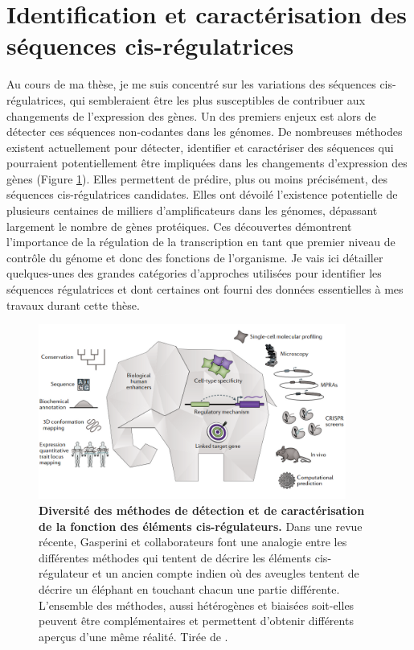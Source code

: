 \section{Identification et caractérisation des séquences \gls{cis}-régulatrices}
\label{sec:identif-cis}

Au cours de ma thèse, je me suis concentré sur les variations des séquences \gls{cis}-régulatrices, qui sembleraient être les plus susceptibles de contribuer aux changements de l’expression des gènes. Un des premiers enjeux est alors de détecter ces séquences non-codantes dans les génomes. De nombreuses méthodes existent actuellement pour détecter, identifier et caractériser des séquences qui pourraient potentiellement être impliquées dans les changements d’expression des gènes (Figure \ref{fig:Fig7}). Elles permettent de prédire, plus ou moins précisément, des séquences \gls{cis}-régulatrices candidates. Elles ont dévoilé l’existence potentielle de plusieurs centaines de milliers d’\glspl{amplificateur} dans les génomes, dépassant largement le nombre de gènes protéiques. Ces découvertes démontrent l’importance de la régulation de la transcription en tant que premier niveau de contrôle du génome et donc des fonctions de l’organisme. Je vais ici détailler quelques-unes des grandes catégories d’approches utilisées pour identifier les séquences régulatrices et dont certaines ont fourni des données essentielles à mes travaux durant cette thèse.

\begin{figure}[h]
    \centering
    \includegraphics[width=0.9\textwidth, page=1] {figures/introduction/fig7.png}
    \caption[Diversité des méthodes de détection et de caractérisation de la fonction des éléments \gls{cis}-régulateurs.]{
    \textbf{Diversité des méthodes de détection et de caractérisation de la fonction des éléments \gls{cis}-régulateurs.}
    Dans une revue récente, Gasperini et collaborateurs font une analogie entre les différentes méthodes qui tentent de décrire les éléments \gls{cis}-régulateur et un ancien compte indien où des aveugles tentent de décrire un éléphant en touchant chacun une partie différente. L'ensemble des méthodes, aussi hétérogènes et biaisées soit-elles peuvent être complémentaires et permettent d'obtenir différents aperçus d'une même réalité. Tirée de \citep{gasperini_towards_2020}.\\
    }
    \label{fig:Fig7}
\end{figure}


